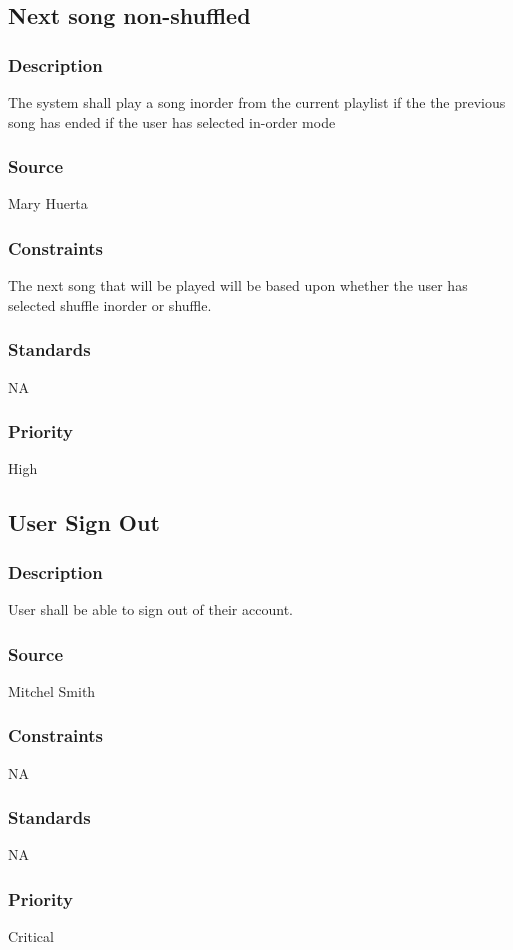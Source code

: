 \subsection{Next song non-shuffled}
\subsubsection{Description}
The system shall play a song inorder from the current playlist if the the previous song has ended if the user has selected in-order mode
\subsubsection{Source}
Mary Huerta
\subsubsection{Constraints}
The next song that will be played will be based upon whether the user has selected shuffle inorder or shuffle.
\subsubsection{Standards}
NA
\subsubsection{Priority}
High



\subsection{User Sign Out}
\subsubsection{Description}
User shall be able to sign out of their account.
\subsubsection{Source}
Mitchel Smith
\subsubsection{Constraints}
NA
\subsubsection{Standards}
NA
\subsubsection{Priority}
Critical




